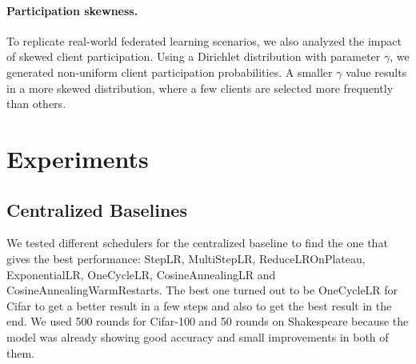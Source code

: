 \documentclass[10pt,twocolumn,letterpaper]{article}
\begin{document}
\paragraph{Participation skewness.} To replicate real-world federated learning scenarios, we also analyzed the impact of skewed client participation.
Using a Dirichlet distribution with parameter $\gamma$, we generated non-uniform client participation probabilities. A smaller $\gamma$ value results in a more skewed distribution, where a few clients are selected more frequently than others.


\section{Experiments}
\subsection{Centralized Baselines}

We tested different schedulers for the centralized baseline to find the one that gives the best performance: StepLR, MultiStepLR, ReduceLROnPlateau, ExponentialLR, OneCycleLR,  CosineAnnealingLR and CosineAnnealingWarmRestarts.
The best one turned out to be OneCycleLR for Cifar to get a better result in a few steps and also to get the best result in the end.
We used 500 rounds for Cifar-100 and 50 rounds on Shakespeare because the model was already showing good accuracy and small improvements in both of them.
\end{document}
